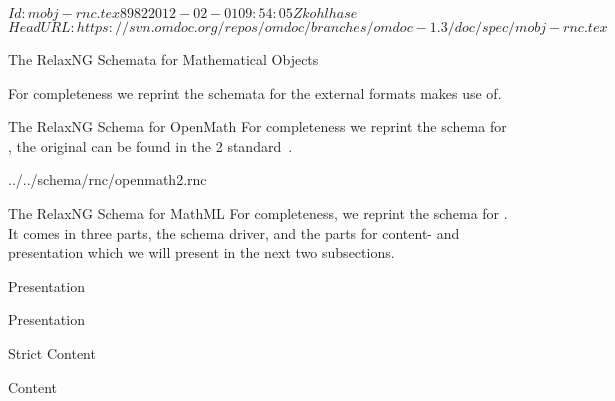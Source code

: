 \svnInfo $Id: mobj-rnc.tex 8982 2012-02-01 09:54:05Z kohlhase $
\svnKeyword $HeadURL: https://svn.omdoc.org/repos/omdoc/branches/omdoc-1.3/doc/spec/mobj-rnc.tex $

\begin{tchapter}[id=mobj-rnc]{The RelaxNG Schemata for Mathematical Objects}

For completeness we reprint the {\relaxng} schemata for the external formats
{\omdoc} makes use of.
\begin{tsection}[id=rnc:openmath]{The RelaxNG Schema for OpenMath}
  For completeness we reprint the {\relaxng} schema for {\openmath}, the original
  can be found in the {\openmath}2 standard~\cite{BusCapCar:2oms04}.
  
  {../../schema/rnc/openmath2.rnc}
\end{tsection}

\begin{tsection}[id=rnc:mathml]{The RelaxNG Schema for MathML}
  For completeness, we reprint the {\relaxng} schema for {\mathml}. It comes in three
  parts, the schema driver, and the parts for content- and presentation {\mathml} which we
  will present in the next two subsections.
  

\begin{tsubsection}[id=rnc:mathml-common]{Presentation {\mathml}}
  
\end{tsubsection}

\begin{tsubsection}[id=rnc:pmathml]{Presentation {\mathml}}
  
\end{tsubsection}

\begin{tsubsection}[id=rnc:strict-cmathml]{Strict Content {\mathml}}
  
\end{tsubsection}

\begin{tsubsection}[id=rnc:cmathml]{Content {\mathml}}
  
\end{tsubsection}
\end{tsection}
\end{tchapter}



